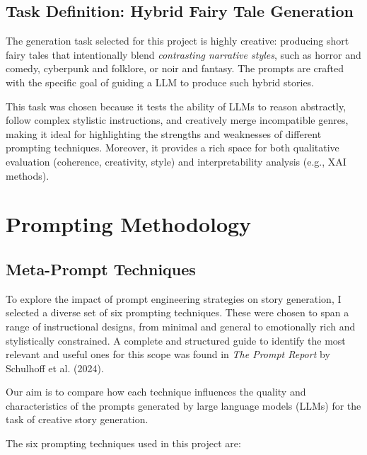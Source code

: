 \documentclass[12pt]{article}
\begin{document}
\subsection{Task Definition: Hybrid Fairy Tale Generation}

The generation task selected for this project is highly creative: producing short fairy tales that intentionally blend \textit{contrasting narrative styles}, such as horror and comedy, cyberpunk and folklore, or noir and fantasy. The prompts are crafted with the specific goal of guiding a LLM to produce such hybrid stories.

This task was chosen because it tests the ability of LLMs to reason abstractly, follow complex stylistic instructions, and creatively merge incompatible genres, making it ideal for highlighting the strengths and weaknesses of different prompting techniques. Moreover, it provides a rich space for both qualitative evaluation (coherence, creativity, style) and interpretability analysis (e.g., XAI methods).

\newpage
\section{Prompting Methodology}

\subsection{Meta-Prompt Techniques}

To explore the impact of prompt engineering strategies on story generation, I selected a diverse set of six prompting techniques. These were chosen to span a range of instructional designs, from minimal and general to emotionally rich and stylistically constrained. 
A complete and structured guide to identify the most relevant and useful ones for this scope was found in \textit{The Prompt Report} by Schulhoff et al. (2024).

Our aim is to compare how each technique influences the quality and characteristics of the prompts generated by large language models (LLMs) for the task of creative story generation.

The six prompting techniques used in this project are:
\end{document}
